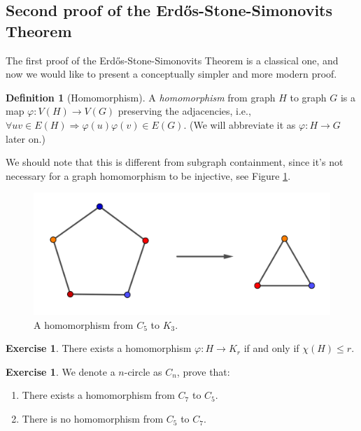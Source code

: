 \documentclass{article}
\theoremstyle{definition}
\newtheorem{definition}[theorem]{Definition}
\newtheorem{exercise}[theorem]{Exercise}
\def\Erdos{Erd\H{o}s}
\begin{document}
\subsection{Second proof of the \Erdos{}-Stone-Simonovits Theorem}

The first proof of the \Erdos{}-Stone-Simonovits Theorem is a classical one, and now we would like to present a conceptually simpler and more modern proof.

\begin{definition}[Homomorphism]
    A \emph{homomorphism} from graph $H$ to graph $G$ is a map $\varphi: V(H) \rightarrow V(G)$ preserving the adjacencies, i.e., $\forall uv \in E(H) \Rightarrow \varphi(u)\varphi(v) \in E(G).$ (We will abbreviate it as $\varphi: H \rightarrow G$ later on.)
\end{definition}

We should note that this is different from subgraph containment, since it's not necessary for a graph homomorphism to be injective, see Figure \ref{fig:4-2}.

\begin{figure}[H]
    \centering
    \includegraphics[scale=0.7]{4-2.png}
    \caption{A homomorphism from $C_{5}$ to $K_3$.}
    \label{fig:4-2}
\end{figure}

\begin{exercise}
    There exists a homomorphism $\varphi: H \rightarrow K_r$ if and only if $\chi(H) \leq r$.
\end{exercise}

\begin{exercise}
    We denote a $n$-circle as $C_n$, prove that:
    
    \begin{enumerate}
        \item There exists a homomorphism from $C_7$ to $C_5$.

        \item There is no homomorphism from $C_5$ to $C_7$.
    \end{enumerate}
\end{exercise}
\end{document}
